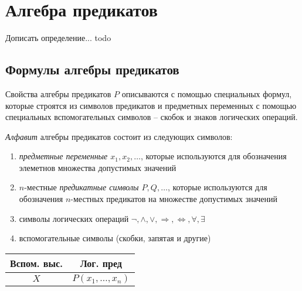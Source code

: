 \documentclass[otchet]{SCWorks}
\begin{document}
\section{Алгебра предикатов}
Дописать определение... todo
\subsection{Формулы алгебры предикатов}
\par Свойства алгебры предикатов $P$ описываются с помощью специальных формул, которые строятся из символов предикатов и предметных переменных с помощью специальных вспомогательных символов -- скобок и знаков логических операций.
\par {\it Алфавит} алгебры предикатов состоит из следующих символов:
\begin{enumerate}
    \item {\it предметные переменные $x_1,x_2,\dots$}, которые используются для обозначения элеметнов множества допустимых значений
    \item $n$-местные {\it предикатные символы $P,Q,\dots$}, которые используются для обозначения $n$-местных предикатов на множестве допустимых значений
    \item символы логических операций $\neg, \land, \lor, \Rightarrow, \Leftrightarrow, \forall, \exists$
    \item вспомогательные символы (скобки, запятая и другие)
\end{enumerate}
{\renewcommand{\arraystretch}{1.5}
\setlength{\tabcolsep}{5pt}
    \begin{longtable}[h!]{ |c|c| }
        \hline
        Вспом. выс. & Лог. пред \\
        \hline
        \endhead
        $X$ & $P(x_1, \dots, x_n)$ \\
        \hline
    \end{longtable}}
\end{document}
